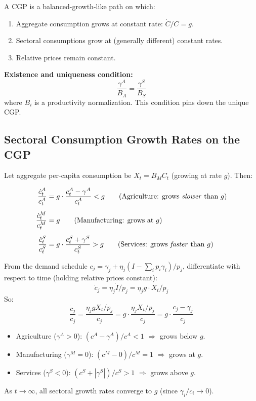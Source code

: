 \documentclass[a4paper,11pt]{article}
\begin{document}
\begin{keyformulabox}[title={CGP Definition}]
A CGP is a balanced-growth-like path on which:
\begin{enumerate}[nosep]
    \item Aggregate consumption grows at constant rate: $\dot{C}/C = g$.
    \item Sectoral consumptions grow at (generally different) constant rates.
    \item Relative prices remain constant.
\end{enumerate}
\textbf{Existence and uniqueness condition:}
\[
\boxed{\frac{\gamma^A}{B_A} = \frac{\gamma^S}{B_S}}
\]
where $B_i$ is a productivity normalization. This condition pins down the unique CGP.
\end{keyformulabox}

\subsection*{Sectoral Consumption Growth Rates on the CGP}

Let aggregate per-capita consumption be $X_t = B_M C_t$ (growing at rate $g$). Then:

\begin{align*}
\frac{\dot{c}_t^A}{c_t^A} &= g \cdot \frac{c_t^A - \gamma^A}{c_t^A} < g
\tag{Agriculture: grows \emph{slower} than $g$} \\[0.5em]
\frac{\dot{c}_t^M}{c_t^M} &= g
\tag{Manufacturing: grows at $g$} \\[0.5em]
\frac{\dot{c}_t^S}{c_t^S} &= g \cdot \frac{c_t^S + \gamma^S}{c_t^S} > g
\tag{Services: grows \emph{faster} than $g$}
\end{align*}

\begin{derivationbox}[title={Intuition for CGP Growth Rate Differences}]
From the demand schedule $c_j = \gamma_j + \eta_j(I - \sum_i p_i \gamma_i)/p_j$, differentiate with respect to time (holding relative prices constant):
\[
\dot{c}_j = \eta_j \dot{I}/p_j = \eta_j g \cdot X_t / p_j
\]
So:
\[
\frac{\dot{c}_j}{c_j} = \frac{\eta_j g X_t / p_j}{c_j} = g \cdot \frac{\eta_j X_t/p_j}{c_j} = g \cdot \frac{c_j - \gamma_j}{c_j}
\]
\begin{itemize}[nosep]
    \item Agriculture ($\gamma^A > 0$): $(c^A - \gamma^A)/c^A < 1$ $\Rightarrow$ grows below $g$.
    \item Manufacturing ($\gamma^M = 0$): $(c^M - 0)/c^M = 1$ $\Rightarrow$ grows at $g$.
    \item Services ($\gamma^S < 0$): $(c^S + |\gamma^S|)/c^S > 1$ $\Rightarrow$ grows above $g$.
\end{itemize}
As $t \to \infty$, all sectoral growth rates converge to $g$ (since $\gamma_i/c_i \to 0$).
\end{derivationbox}
\end{document}
